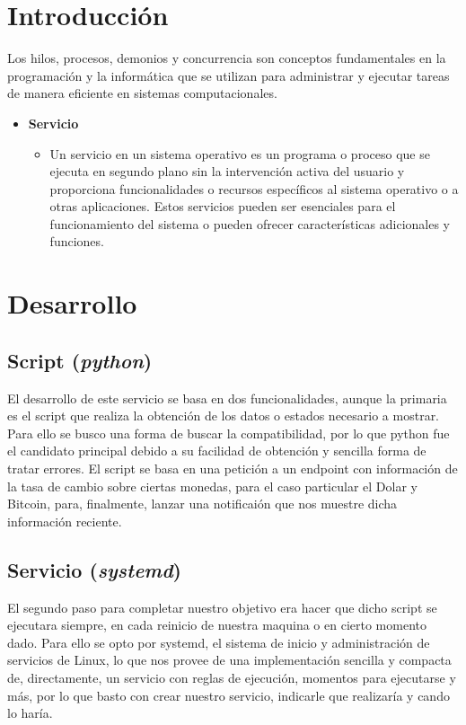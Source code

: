 \documentclass{dense_template}
\begin{document}
\maketitle
\tableofcontents
\newpage
\section{Introducción}
Los hilos, procesos, demonios y concurrencia son conceptos fundamentales en la programación y la informática que se utilizan para administrar y ejecutar tareas de manera eficiente en sistemas computacionales.

\begin{itemize}
    \item \textbf{Servicio}
    \begin{itemize}
        \item Un servicio en un sistema operativo es un programa o proceso que se ejecuta en segundo plano sin la intervención activa del usuario y proporciona funcionalidades o recursos específicos al sistema operativo o a otras aplicaciones. Estos servicios pueden ser esenciales para el funcionamiento del sistema o pueden ofrecer características adicionales y funciones.
    \end{itemize}
\end{itemize}

\section{Desarrollo}
\subsection{Script (\textit{python})}
El desarrollo de este servicio se basa en dos funcionalidades, aunque la primaria es el script que realiza la obtención de los datos o estados necesario a mostrar. Para ello se busco una forma de buscar la compatibilidad, por lo que python fue el candidato principal debido a su facilidad de obtención y sencilla forma de tratar errores.
El script se basa en una petición a un endpoint con información de la tasa de cambio sobre ciertas monedas, para el caso particular el Dolar y Bitcoin, para, finalmente, lanzar una notificaión que nos muestre dicha información reciente.

\subsection{Servicio (\textit{systemd})}
El segundo paso para completar nuestro objetivo era hacer que dicho script se ejecutara siempre, en cada reinicio de nuestra maquina o en cierto momento dado. Para ello se opto por systemd, el sistema de inicio y administración de servicios de Linux, lo que nos provee de una implementación sencilla y compacta de, directamente, un servicio con reglas de ejecución, momentos para ejecutarse y más, por lo que basto con crear nuestro servicio, indicarle que realizaría y cando lo haría.
\end{document}
